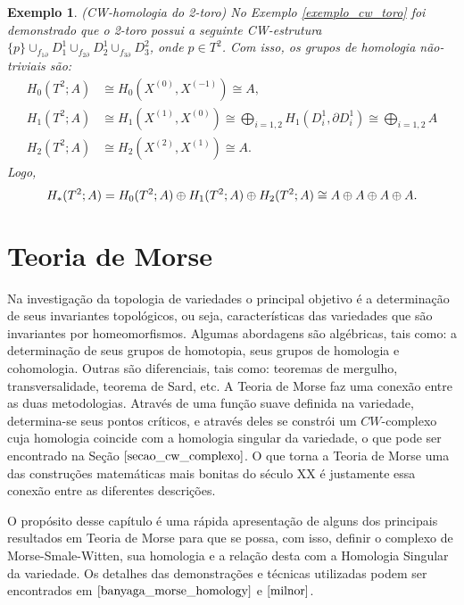 \documentclass[12pt]{book}
\newtheorem{exemplo}[teorema]{Exemplo}
\newcommand{\celula}[2]{D^{#1}_{#2}}
\newcommand{\homologia}[2]{H_{#1}(#2;A)}
\newcommand{\homologiarelcel}[3]{H_{#1}(D^{#2}_{#3}, \partial D^{#2}_{#3})}
\newcommand{\homologiarelskele}[3]{H_{#1}(X^{(#2)}, X^{(#3)})}
\newcommand{\somadir}[1]{\bigoplus \limits_{#1}}
\begin{document}
	\begin{exemplo}
		(CW-homologia do 2-toro) No Exemplo \ref{exemplo_cw_toro} foi demonstrado que o 2-toro possui a seguinte CW-estrutura $\{p\}\cup_{f_{1\partial}}\celula{1}{1}\cup_{f_{2\partial}}\celula{1}{2}\cup_{f_{3\partial}}\celula{2}{3}$, onde $p \in T^{2}$. Com isso, os grupos de homologia não-triviais são:
		$$
		\begin{aligned}
		\homologia{0}{T^{2}} &\cong \homologiarelskele{0}{0}{-1} \cong A,
		\\
		\homologia{1}{T^{2}} &\cong \homologiarelskele{1}{1}{0} \cong \somadir{i=1,2}\homologiarelcel{1}{1}{i} \cong \somadir{i=1,2} A
		\\
		\homologia{2}{T^{2}} &\cong \homologiarelskele{2}{2}{1} \cong A.
		\end{aligned}
		$$
		Logo,
		$$
		\\
		\homologia{*}{T^{2}} = \homologia{0}{T^{2}}\oplus\homologia{1}{T^{2}} \oplus\homologia{2}{T^{2}}\cong A \oplus A \oplus A \oplus A.
		$$
	\end{exemplo}	
	
	
	\chapter{Teoria de Morse}\label{capitulo_teoria_morse}
	Na investigação da topologia de variedades o principal objetivo é a determinação de seus invariantes topológicos, ou seja, características das variedades que são invariantes por homeomorfismos. Algumas abordagens são algébricas, tais como: a determinação de seus grupos de homotopia, seus grupos de homologia e cohomologia. Outras são diferenciais, tais como: teoremas de mergulho, transversalidade, teorema de Sard, etc. A Teoria de Morse faz uma conexão entre as duas metodologias. Através de uma função suave definida na variedade, determina-se seus pontos críticos, e através deles se constrói um $CW$-complexo cuja homologia coincide com a homologia singular da variedade, o que pode ser encontrado na Seção $\ref{secao_cw_complexo}$. O que torna a Teoria de Morse uma das construções matemáticas mais bonitas do século XX é justamente essa conexão entre as diferentes descrições.
	
	O propósito desse capítulo é uma rápida apresentação de alguns dos principais resultados em Teoria de Morse para que se possa, com isso, definir o complexo de Morse-Smale-Witten, sua homologia e a relação desta com a Homologia Singular da variedade. Os detalhes das demonstrações e técnicas utilizadas podem ser encontrados em $\cite{banyaga_morse_homology}$ e $\cite{milnor}$.
	
\end{document}
